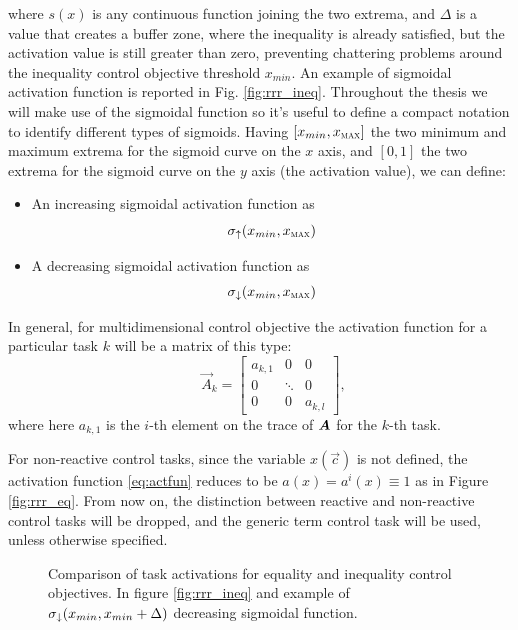 where $s(x)$ is any continuous function joining the two extrema, and $\Delta$ is a value that creates a buffer zone, where the inequality is already satisfied, but the activation value is still greater than zero, preventing chattering problems around the inequality control objective threshold $x_{min}$. An example of sigmoidal activation function is reported in Fig. \ref{fig:rrr_ineq}.
Throughout the thesis we will make use of the sigmoidal function so it's useful to define a compact notation to identify different types of sigmoids. Having $[x_{min}, x_{\textsc{max}}]$ the two minimum and maximum extrema for the sigmoid curve on the $x$ axis, and $[0,1]$ the two extrema for the sigmoid curve on the $y$ axis (the activation value), we can define:
\begin{itemize}
	\item An increasing sigmoidal activation function as
		\begin{equation}
			\sigma_{\uparrow}( x_{min}, x_{\textsc{max}})
		\end{equation}
	\item A decreasing sigmoidal activation function as
		\begin{equation}
			\sigma_{\downarrow}(x_{min}, x_{\textsc{max}})
		\end{equation}
\end{itemize}
In general, for multidimensional control objective the activation function for a particular task $k$ will be a matrix of this type:
\begin{equation}\label{eq:actmatrix}
\qquad \vec{A}_{k} = \begin{bmatrix}
					a_{k,1} & 0      & 0   \\
					0   & \ddots & 0   \\
					0   & 0      & a_{k,l}
					\end{bmatrix},
\end{equation}%
%
where here $a_{k,1}$ is the $i$-th element on the trace of $\bm{A}$ for the $k$-th task.

For non-reactive control tasks, since the variable $x(\vec{c})$ is not defined, the activation function \eqref{eq:actfun} reduces to be $a(x) = a^i(x) \equiv 1$ as in Figure \ref{fig:rrr_eq}. From now on, the distinction between reactive and non-reactive control tasks will be dropped, and the generic term control task will be used, unless otherwise specified. 


\begin{figure}[t]
	\centering
	\hfill
	\caption{Comparison of task activations for equality and inequality control objectives. In figure \ref{fig:rrr_ineq} and example of $\sigma_{\downarrow}(x_{min}, x_{min}+\Delta)$ decreasing sigmoidal function.}
	\label{fig:activation_function}
\end{figure}

